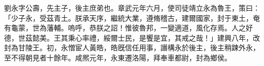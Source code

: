 \begin{pinyinscope}
 
 
 劉永字公壽，先主子，後主庶弟也。章武元年六月，使司徒靖立永為魯王，策曰：「少子永，受茲青土。朕承天序，繼統大業，遵脩稽古，建爾國家，封于東土，奄有龜蒙，世為藩輔。嗚呼，恭朕之詔！惟彼魯邦，一變適道，風化存焉。人之好德，世茲懿美。王其秉心率禮，綏爾士民，是饗是宜，其戒之哉！」建興八年，改封為甘陵王。初，永憎宦人黃皓，皓旣信任用事，譖構永於後主，後主稍踈外永，至不得朝見者十餘年。咸熈元年，永東遷洛陽，拜奉車都尉，封為鄉侯。
 
 
\end{pinyinscope}